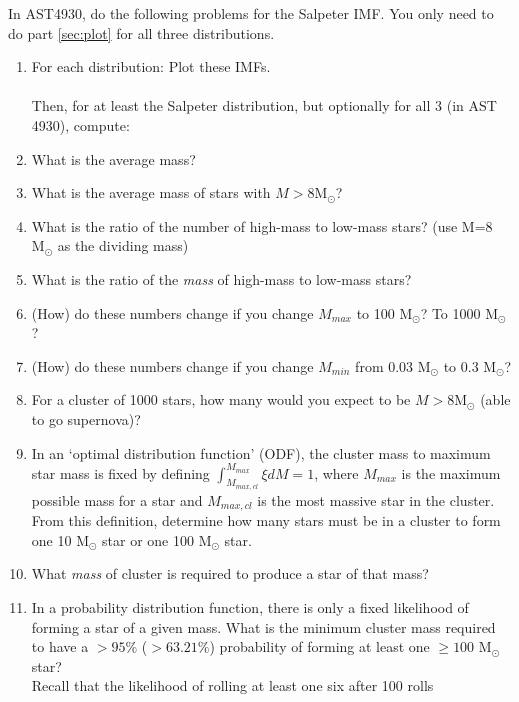 \documentclass{article}
\newcommand{\msun}{\ensuremath{\mathrm{M}_\odot}\xspace}
\begin{document}
\begin{enumerate}
    In AST4930, do the following problems for the Salpeter IMF.  You only need
    to do part \ref{sec:plot} for all three distributions.

    \begin{enumerate}

        \item For each distribution: Plot these IMFs.
            \label{sec:plot}
            \\
            \\

            Then, for at least the Salpeter distribution, but optionally for all 3 (in AST 4930), compute:
        \item What is the average mass?
        \item What is the average mass of stars with $M>8\msun$?
        \item What is the ratio of the number of high-mass to low-mass stars?
            (use M=8 \msun as the dividing mass)
        \item What is the ratio of the \emph{mass} of high-mass to low-mass stars?
        \item (How) do these numbers change if you change $M_{max}$ to 100 \msun?  To 1000 \msun?
        \item (How) do these numbers change if you change $M_{min}$ from 0.03 \msun to 0.3 \msun?
        \item For a cluster of 1000 stars, how many would you expect to be
            $M>8\msun$ (able to go supernova)?
        \item In an `optimal distribution function' (ODF), the cluster mass to maximum star mass
            is fixed by defining $\int_{M_{max,cl}}^{M_{max}} \xi dM = 1$,
            where $M_{max}$ is the maximum possible mass for a star and $M_{max,cl}$ is
            the most massive star in the cluster.
            From this definition, determine how many stars must be in a cluster
            to form one 10 \msun star or one 100 \msun star.
        \item What \emph{mass} of cluster is required to produce a star of that mass?
        \item In a probability distribution function, there is only a fixed likelihood
            of forming a star of a given mass.  What is the minimum cluster mass
            required to have a $>95\%$ ($>63.21\%$) probability of forming at least one $\geq100$
            \msun star?\\
            Recall that the likelihood of rolling at least one six after 100 rolls

\end{enumerate}
\end{enumerate}
\end{document}
